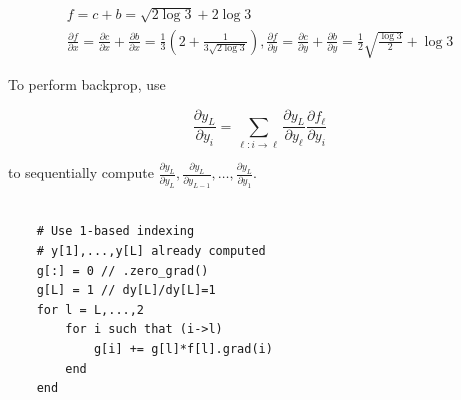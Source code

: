 \begin{example}
\begin{itemize}
        $$
        \begin{gathered}
        f=c+b=\sqrt{2 \log 3}+2 \log 3 \\
        \frac{\partial f}{\partial x}=\frac{\partial c}{\partial x}+\frac{\partial b}{\partial x}=\frac{1}{3}\left(2+\frac{1}{3 \sqrt{2 \log 3}}\right), \frac{\partial f}{\partial y}=\frac{\partial c}{\partial y}+\frac{\partial b}{\partial y}=\frac{1}{2} \sqrt{\frac{\log 3}{2}}+\log 3
        \end{gathered}
        $$
    \end{itemize}
\end{example}

\begin{definition}
    To perform backprop, use

    $$
    \frac{\partial y_{L}}{\partial y_{i}}=\sum_{\ell: i \rightarrow \ell} \frac{\partial y_{L}}{\partial y_{\ell}} \frac{\partial f_{\ell}}{\partial y_{i}}
    $$

    to sequentially compute $\frac{\partial y_{L}}{\partial y_{L}}, \frac{\partial y_{L}}{\partial y_{L-1}}, \ldots, \frac{\partial y_{L}}{\partial y_{1}}$.\\\\ 

    \begin{verbatim}
    # Use 1-based indexing
    # y[1],...,y[L] already computed
    g[:] = 0 // .zero_grad()
    g[L] = 1 // dy[L]/dy[L]=1
    for l = L,...,2
        for i such that (i->l)
            g[i] += g[l]*f[l].grad(i)
        end
    end
    \end{verbatim}
\end{definition}

